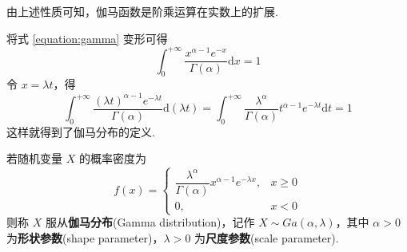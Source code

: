 \begin{note}
    \indent 由上述性质可知，伽马函数是阶乘运算在实数上的扩展.
\end{note}

将式 \eqref{equation:gamma} 变形可得
$$
\int_{0}^{+\infty} \dfrac{x^{\alpha - 1} e^{-x}}{\Gamma(\alpha)} \text{d}x = 1
$$
令 $x = \lambda t$，得
$$
\int_{0}^{+\infty} \dfrac{(\lambda t)^{\alpha - 1} e^{-\lambda t}}{\Gamma(\alpha)} \text{d}(\lambda t) = \int_{0}^{+\infty} \dfrac{\lambda^{\alpha}}{\Gamma(\alpha)} t^{\alpha - 1}  e^{-\lambda t} \text{d}t = 1
$$
这样就得到了伽马分布的定义.

\begin{definition}
    \indent 若随机变量 $X$ 的概率密度为
    $$
    f(x) = \begin{cases}
        \dfrac{\lambda^\alpha}{\Gamma(\alpha)} x^{\alpha - 1} e^{-\lambda x}, & x \geqslant 0 \\[0.5em]
        0, & x<0
    \end{cases}
    $$
    则称 $X$ 服从\textbf{伽马分布}(Gamma distribution)，记作 $X \sim Ga(\alpha,\lambda)$，其中 $\alpha > 0$ 为\textbf{形状参数}(shape parameter)，$\lambda > 0$ 为\textbf{尺度参数}(scale parameter).
\end{definition}

